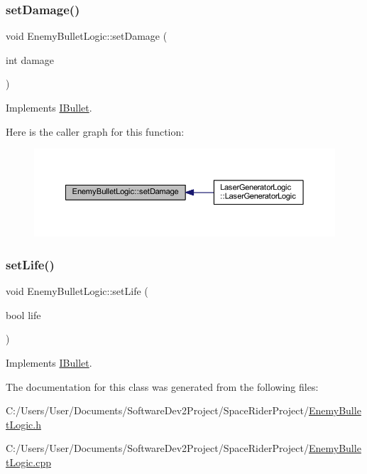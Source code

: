 \subsubsection{\texorpdfstring{set\+Damage()}{setDamage()}}
{\footnotesize\ttfamily void Enemy\+Bullet\+Logic\+::set\+Damage (\begin{DoxyParamCaption}\item[{int}]{damage }\end{DoxyParamCaption})\hspace{0.3cm}{\ttfamily [virtual]}}



Implements \hyperlink{class_i_bullet_a072298555accb47f11b84f4c781ae876}{I\+Bullet}.

Here is the caller graph for this function\+:\nopagebreak
\begin{figure}[H]
\begin{center}
\leavevmode
\includegraphics[width=350pt]{class_enemy_bullet_logic_a3e4ce40e06e9fa23826bd74015fd75f2_icgraph}
\end{center}
\end{figure}
\mbox{\label{class_enemy_bullet_logic_a92e4dfb6a528114ad58f9ae64924fbab}} 
\subsubsection{\texorpdfstring{set\+Life()}{setLife()}}
{\footnotesize\ttfamily void Enemy\+Bullet\+Logic\+::set\+Life (\begin{DoxyParamCaption}\item[{bool}]{life }\end{DoxyParamCaption})\hspace{0.3cm}{\ttfamily [virtual]}}



Implements \hyperlink{class_i_bullet_abf99befdaa121e7c9ca2acc2ed75b513}{I\+Bullet}.



The documentation for this class was generated from the following files\+:\begin{DoxyCompactItemize}
\item 
C\+:/\+Users/\+User/\+Documents/\+Software\+Dev2\+Project/\+Space\+Rider\+Project/\hyperlink{_enemy_bullet_logic_8h}{Enemy\+Bullet\+Logic.\+h}\item 
C\+:/\+Users/\+User/\+Documents/\+Software\+Dev2\+Project/\+Space\+Rider\+Project/\hyperlink{_enemy_bullet_logic_8cpp}{Enemy\+Bullet\+Logic.\+cpp}\end{DoxyCompactItemize}
